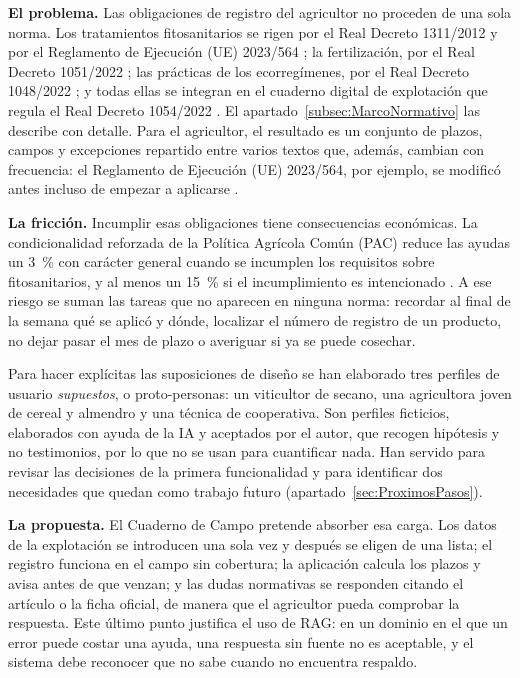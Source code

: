 \textbf{El problema.} Las obligaciones de registro del agricultor no proceden de una sola norma. Los tratamientos fitosanitarios se rigen por el Real Decreto 1311/2012 \citep{rd1311-2012} y por el Reglamento de Ejecución (UE) 2023/564 \citep{reg2023-564}; la fertilización, por el Real Decreto 1051/2022 \citep{rd1051-2022}; las prácticas de los ecorregímenes, por el Real Decreto 1048/2022 \citep{rd1048-2022}; y todas ellas se integran en el cuaderno digital de explotación que regula el Real Decreto 1054/2022 \citep{rd1054-2022}. El apartado~\ref{subsec:MarcoNormativo} las describe con detalle. Para el agricultor, el resultado es un conjunto de plazos, campos y excepciones repartido entre varios textos que, además, cambian con frecuencia: el Reglamento de Ejecución (UE) 2023/564, por ejemplo, se modificó antes incluso de empezar a aplicarse \citep{reg2025-2203}.

\textbf{La fricción.} Incumplir esas obligaciones tiene consecuencias económicas. La condicionalidad reforzada de la Política Agrícola Común (PAC) reduce las ayudas un 3~\% con carácter general cuando se incumplen los requisitos sobre fitosanitarios, y al menos un 15~\% si el incumplimiento es intencionado \citep[art.~15]{rd1049-2022}. A ese riesgo se suman las tareas que no aparecen en ninguna norma: recordar al final de la semana qué se aplicó y dónde, localizar el número de registro de un producto, no dejar pasar el mes de plazo o averiguar si ya se puede cosechar. 

Para hacer explícitas las suposiciones de diseño se han elaborado tres perfiles de usuario \emph{supuestos}, o proto-personas: un viticultor de secano, una agricultora joven de cereal y almendro y una técnica de cooperativa. Son perfiles ficticios, elaborados con ayuda de la IA y aceptados por el autor, que recogen hipótesis y no testimonios, por lo que no se usan para cuantificar nada. Han servido para revisar las decisiones de la primera funcionalidad y para identificar dos necesidades que quedan como trabajo futuro (apartado~\ref{sec:ProximosPasos}).

\textbf{La propuesta.} El Cuaderno de Campo pretende absorber esa carga. Los datos de la explotación se introducen una sola vez y después se eligen de una lista; el registro funciona en el campo sin cobertura; la aplicación calcula los plazos y avisa antes de que venzan; y las dudas normativas se responden citando el artículo o la ficha oficial, de manera que el agricultor pueda comprobar la respuesta. Este último punto justifica el uso de RAG: en un dominio en el que un error puede costar una ayuda, una respuesta sin fuente no es aceptable, y el sistema debe reconocer que no sabe cuando no encuentra respaldo.

